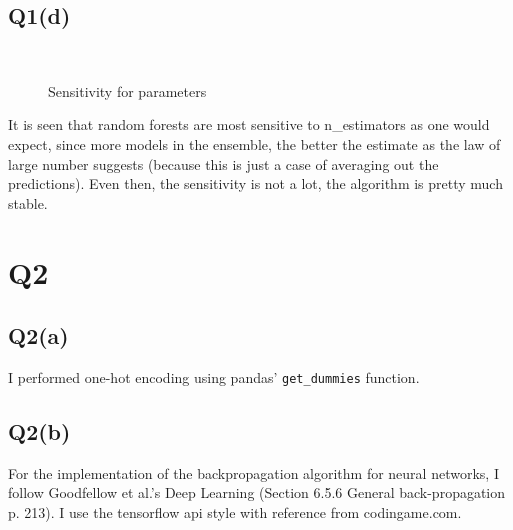 \documentclass[11pt]{article}
\begin{document}
\subsection{Q1(d)}
\label{sec-1-4}
\begin{figure}[!htpb]
	\\
	\begin{center}
	\end{center}
	\caption{Sensitivity for parameters}
\end{figure}
It is seen that random forests are most sensitive to n\_estimators as
one would expect, since more models in the ensemble, the better the
estimate as the law of large number suggests (because this is just a
case of averaging out the predictions). Even then, the sensitivity is
not a lot, the algorithm is pretty much stable.

\section{Q2}
\label{sec-2}
\subsection{Q2(a)}
\label{sec-2-1}
I performed one-hot encoding using pandas' \texttt{get\_dummies} function.
\subsection{Q2(b)}
\label{sec-2-2}
For the implementation of the backpropagation algorithm for neural
networks, I follow Goodfellow et al.'s Deep Learning\cite{goodfellow}
(Section 6.5.6 General back-propagation p. 213). I use the tensorflow
api style with reference from codingame.com\cite{codingame}.
\end{document}
